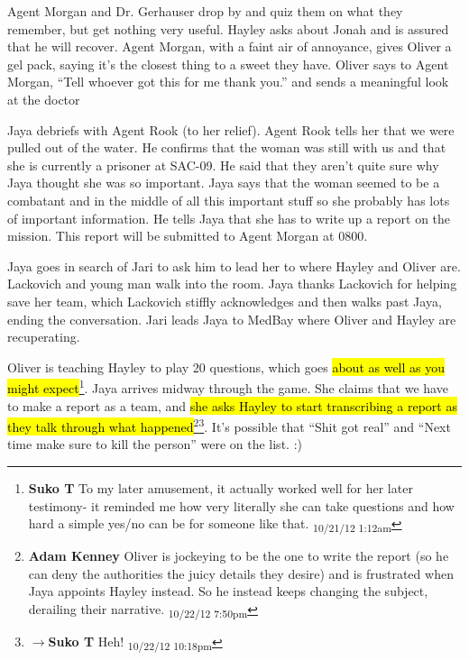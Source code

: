Agent Morgan and Dr. Gerhauser drop by and quiz them on what they remember, but get nothing very useful.  Hayley asks about Jonah and is assured that he will recover.  Agent Morgan, with a faint air of annoyance, gives Oliver a gel pack, saying it's the closest thing to a sweet they have.  Oliver says to Agent Morgan, ``Tell whoever got this for me thank you.''  and sends a meaningful look at the doctor



Jaya debriefs with Agent Rook (to her relief). Agent Rook tells her that we were pulled out of the water. He confirms that the woman was still with us and that she is currently a prisoner at SAC-09.  He said that they aren't quite sure why Jaya thought she was so important. Jaya says that the woman seemed to be a combatant and in the middle of all this important stuff so she probably has lots of important information.  He tells Jaya that she has to write up a report on the mission.  This report will be submitted to Agent Morgan at 0800.  



Jaya goes in search of Jari to ask him to lead her to where Hayley and Oliver are.  Lackovich and young man walk into the room.  Jaya thanks Lackovich for helping save her team, which Lackovich stiffly acknowledges and then walks past Jaya, ending the conversation.  Jari leads Jaya to MedBay where Oliver and Hayley are recuperating.



Oliver is teaching Hayley to play 20 questions, which goes \hl{about as well as you might expect}\footnote{\textbf{Suko T }To my later amusement, it actually worked well for her later testimony- it reminded me how very literally she can take questions and how hard a simple yes/no can be for someone like that. \textsubscript{10/21/12 1:12am}}. Jaya arrives midway through the game.  She claims that we have to make a report as a team, and \hl{she asks Hayley to start transcribing a report as they talk through what happened}\footnote{\textbf{Adam Kenney }Oliver is jockeying to be the one to write the report (so he can deny the authorities the juicy details they desire) and is frustrated when Jaya appoints Hayley instead.  So he instead keeps changing the subject, derailing their narrative. \textsubscript{10/22/12 7:50pm}}\footnote{$\rightarrow$\textbf{Suko T }Heh! \textsubscript{10/22/12 10:18pm}}.  It's possible that ``Shit got real'' and ``Next time make sure to kill the person'' were on the list. :)



